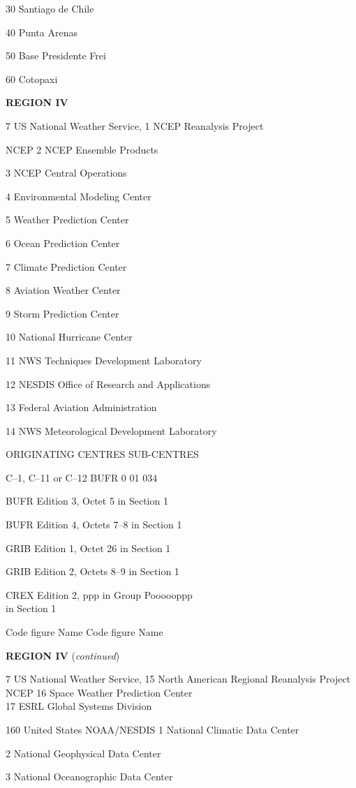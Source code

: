 30 Santiago de Chile

40 Punta Arenas

50 Base Presidente Frei

60 Cotopaxi

\textbf{REGION IV}

7 US National Weather Service, 1 NCEP Reanalysis Project

NCEP 2 NCEP Ensemble Products

3 NCEP Central Operations

4 Environmental Modeling Center

5 Weather Prediction Center

6 Ocean Prediction Center

7 Climate Prediction Center

8 Aviation Weather Center

9 Storm Prediction Center

10 National Hurricane Center

11 NWS Techniques Development Laboratory

12 NESDIS Office of Research and Applications

13 Federal Aviation Administration

14 NWS Meteorological Development Laboratory

ORIGINATING CENTRES SUB-CENTRES

C--1, C--11 or C--12 BUFR 0 01 034

BUFR Edition 3, Octet 5 in Section 1

BUFR Edition 4, Octets 7--8 in Section 1

GRIB Edition 1, Octet 26 in Section 1

GRIB Edition 2, Octets 8--9 in Section 1

CREX Edition 2, ppp in Group Poooooppp\\
in Section 1

Code figure Name Code figure Name

\textbf{REGION IV} (\emph{continued})

7 US National Weather Service, 15 North American Regional Reanalysis Project\\
NCEP 16 Space Weather Prediction Center\\
17 ESRL Global Systems Division

160 United States NOAA/NESDIS 1 National Climatic Data Center

2 National Geophysical Data Center

3 National Oceanographic Data Center

